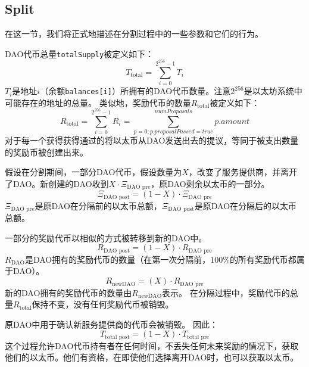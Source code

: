 \documentclass[9pt,oneside]{amsart}
\begin{document}
\begin{multicols}{2}
\section{Split} \label{split}

在这一节，我们将正式地描述在分割过程中的一些参数和它们的行为。

DAO代币总量\verb|totalSupply|被定义如下：
\begin{equation}
T_{\text{total}} = \sum_{i=0}^{2^{256}-1} T_i
\end{equation}
$T_i$是地址$i$（余额\verb|balances[i]|）所拥有的DAO代币数量。注意$2^{256}$是以太坊系统中可能存在的地址的总量。
类似地，奖励代币的数量$R_{\text{total}}$被定义如下：
\begin{equation}
 R_{\text{total}} = \sum_{i=0}^{2^{256}-1} R_i = \sum_{p=0; p.proposalPassed = true}^{numProposals} p.amount
\end{equation}
对于每一个获得获得通过的将以太币从DAO发送出去的提议，等同于被支出数量的奖励币被创建出来。

假设在分割期间，一部分DAO代币，假设数量为$X$，改变了服务提供商，并离开了DAO。新创建的DAO收到$X \cdot \Xi_{\text{DAO pre}}$，原DAO剩余以太币的一部分。
\begin{equation}
 \Xi_{\text{DAO post}} = (1 - X) \cdot \Xi_{\text{DAO pre}}
\end{equation}
$\Xi_{\text{DAO pre}}$是原DAO在分隔前的以太币总额，$\Xi_{\text{DAO post}}$是原DAO在分隔后的以太币总额。

一部分的奖励代币以相似的方式被转移到新的DAO中。
\begin{equation}
 R_{\text{DAO post}} = (1 - X) \cdot R_{\text{DAO pre}}
\end{equation}
$R_{\text{DAO}}$是DAO拥有的奖励代币的数量（在第一次分隔前，$100\%$的所有奖励代币都属于DAO）。
\begin{equation}
 R_{\text{newDAO}} = (X) \cdot R_{\text{DAO pre}}
\end{equation}
新的DAO拥有的奖励代币的数量由$R_{\text{newDAO}}$表示。
在分隔过程中，奖励代币的总量$R_{\text{total}}$保持不变，没有任何奖励代币被销毁。

原DAO中用于确认新服务提供商的代币会被销毁。
因此：
\begin{equation}
 T_{\text{total post}}= (1 - X) \cdot T_{\text{total pre}}
\end{equation}
这个过程允许DAO代币持有者在任何时间，不丢失任何未来奖励的情况下，获取他们的以太币。他们有资格，在即使他们选择离开DAO时，也可以获取以太币。


\end{multicols}
\end{document}
